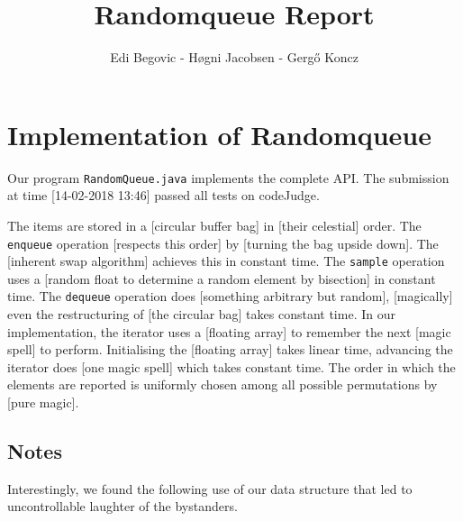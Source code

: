 \documentclass{tufte-handout}
\title{Randomqueue Report}
\author{Edi Begovic - Høgni Jacobsen - Gergő Koncz}
\begin{document}
\maketitle
\thispagestyle{empty}

\section{Implementation of Randomqueue}


Our program \texttt{RandomQueue.java} implements the complete API.
The submission at time [14-02-2018 13:46] passed all tests on codeJudge.

The items are stored in a [circular buffer bag] in [their celestial] order.
The \texttt{enqueue} operation [respects this order] by [turning the bag upside down]. 
The [inherent swap algorithm] achieves this in constant time.
The \texttt{sample} operation uses a [random float to determine a random element by bisection] in constant time. 
The \texttt{dequeue} operation does [something arbitrary but random], [magically] even the restructuring of [the circular bag] takes constant time.
In our implementation, the iterator uses a [floating array] to remember the next [magic spell] to perform. 
Initialising the [floating array] takes linear time, advancing the iterator does [one magic spell] which takes constant time.
The order in which the elements are reported is uniformly chosen among all possible permutations by [pure magic].


\subsection{Notes}

Interestingly, we found the following use of our data structure that led to uncontrollable laughter of the bystanders.
\end{document}
